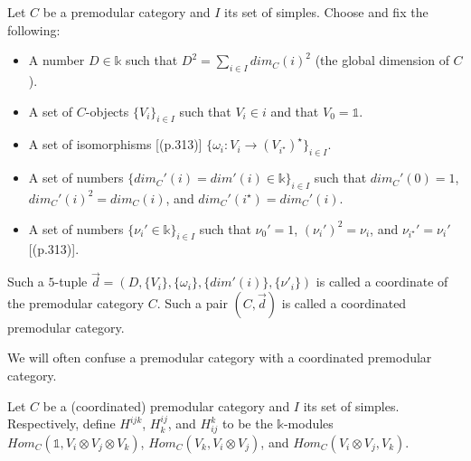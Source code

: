 \begin{definition}\label{def/coordinated-premodular-category}
  Let $C$ be a premodular category and $I$ its set of simples.
  Choose and fix the following:
  \begin{itemize}
    \item A number $D \in \mathbb{k}$ such that
          $D^{2} = \sum_{i \in I} dim_{C}(i)^{2}$ (the global
          dimension of $C$).
    \item A set of $C$-objects $\{V_{i}\}_{i \in I}$ such
          that $V_{i} \in i$ and that $V_{0} = \mathbb{1}$.
    \item A set of isomorphisms [(p.313)]
          $\{\omega_{i}: V_{i} \to (V_{i^{\star}})^{\star}\}_{i \in I}$.
    \item A set of numbers
          $\{dim_{C}'(i) = dim'(i) \in \mathbb{k}\}_{i \in I}$
          such that $dim_{C}'(0) = 1$,
          $dim_{C}'(i)^{2} = dim_{C}(i)$, and
          $dim_{C}'(i^{\star}) = dim_{C}'(i)$.
    \item A set of numbers
          $\{\nu_{i}' \in \mathbb{k}\}_{i \in I}$ such that
          $\nu_{0}' = 1$, $(\nu_{i}')^{2} = \nu_{i}$, and
          $\nu_{i^{\star}}' = \nu_{i}'$ [(p.313)].
  \end{itemize}

  Such a $5$-tuple
  $\vec{d} = (D, \{V_{i}\}, \{\omega_{i}\}, \{dim'(i)\}, \{\nu'_{i}\})$
  is called a coordinate of the premodular category $C$. Such a
  pair $(C, \vec{d})$ is called a coordinated premodular
  category.
\end{definition}

\noindent We will often confuse a premodular category with a
coordinated premodular category.

\begin{definition}\label{def/multiplicity-module}
  Let $C$ be a (coordinated) premodular category and $I$ its set
  of simples. Respectively, define $H^{ijk}$, $H_{k}^{ij}$, and
  $H_{ij}^{k}$ to be the $\mathbb{k}$-modules
  $Hom_{C}(\mathbb{1}, V_{i} \otimes V_{j} \otimes V_{k})$,
  $Hom_{C}(V_{k}, V_{i} \otimes V_{j})$, and
  $Hom_{C}(V_{i} \otimes V_{j}, V_{k})$.
\end{definition}

